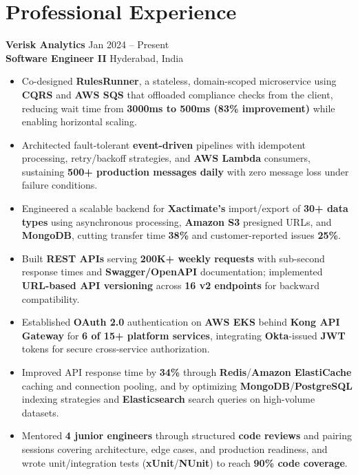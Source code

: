 \documentclass[a4paper,10pt]{article}
\begin{document}
\section*{Professional Experience}

\textbf{Verisk Analytics} \hfill Jan 2024 -- Present \\
\textbf{Software Engineer II} \hfill Hyderabad, India

\begin{itemize}[leftmargin=*]
    \item Co-designed \textbf{RulesRunner}, a stateless, domain-scoped microservice using \textbf{CQRS} and \textbf{AWS SQS} that offloaded compliance checks from the client, reducing wait time from \textbf{3000ms to 500ms (83\% improvement)} while enabling horizontal scaling.
    \item Architected fault-tolerant \textbf{event-driven} pipelines with idempotent processing, retry/backoff strategies, and \textbf{AWS Lambda} consumers, sustaining \textbf{500+ production messages daily} with zero message loss under failure conditions.
    \item Engineered a scalable backend for \textbf{Xactimate's} import/export of \textbf{30+ data types} using asynchronous processing, \textbf{Amazon S3} presigned URLs, and \textbf{MongoDB}, cutting transfer time \textbf{38\%} and customer-reported issues \textbf{25\%}.
    \item Built \textbf{REST APIs} serving \textbf{200K+ weekly requests} with sub-second response times and \textbf{Swagger/OpenAPI} documentation; implemented \textbf{URL-based API versioning} across \textbf{16 v2 endpoints} for backward compatibility.
    \item Established \textbf{OAuth 2.0} authentication on \textbf{AWS EKS} behind \textbf{Kong API Gateway} for \textbf{6 of 15+ platform services}, integrating \textbf{Okta}-issued \textbf{JWT} tokens for secure cross-service authorization.
    \item Improved API response time by \textbf{34\%} through \textbf{Redis}/\textbf{Amazon ElastiCache} caching and connection pooling, and by optimizing \textbf{MongoDB}/\textbf{PostgreSQL} indexing strategies and \textbf{Elasticsearch} search queries on high-volume datasets.
    \item Mentored \textbf{4 junior engineers} through structured \textbf{code reviews} and pairing sessions covering architecture, edge cases, and production readiness, and wrote unit/integration tests (\textbf{xUnit}/\textbf{NUnit}) to reach \textbf{90\% code coverage}.
\end{itemize}
\end{document}
